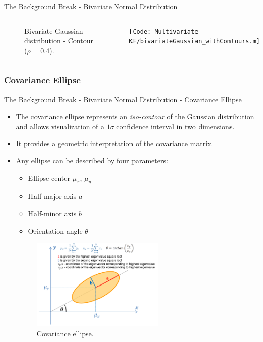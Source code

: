 \begin{frame}{The Background Break - Bivariate Normal Distribution}
\begin{columns}
\begin{figure}
        \vspace{-10pt}
        \caption{Bivariate Gaussian distribution - Contour ($\rho=0.4$).}
    \end{figure}
    \texttt{\tiny [Code: Multivariate KF/bivariateGaussian\_withContours.m]}
\end{columns}
\end{frame}
\subsubsection{Covariance Ellipse}
\begin{frame}{The Background Break - Bivariate Normal Distribution - Covariance Ellipse}

\begin{itemize}
    \item The covariance ellipse represents an \textit{iso-contour} of the Gaussian distribution and allows visualization of a $1\sigma$ confidence interval in two dimensions. 
    \item It provides a geometric interpretation of the covariance matrix.
    \item Any ellipse can be described by four parameters:
    \begin{itemize}
        \item Ellipse center $\mu_x$, $\mu_y$
        \item Half-major axis $a$
        \item Half-minor axis $b$
        \item Orientation angle $\theta$
    \end{itemize}
    \begin{figure}
        \centering
        \includegraphics[width=0.6\textwidth]{Figures/Background2/CovarianceEllipse.png}
        \vspace{-10pt}
        \caption{Covariance ellipse.}
    \end{figure}
    

\end{itemize}

\end{frame}
